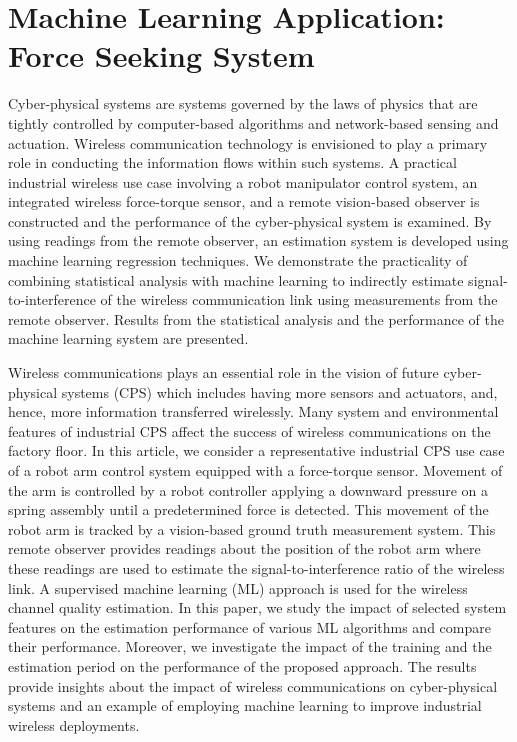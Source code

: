 
\chapter{Machine Learning Application: Force Seeking System}\label{chapter:ftml}

	
\chapterintro*


Cyber-physical systems are systems governed by the laws of physics that are tightly controlled by computer-based algorithms and network-based sensing and actuation.  Wireless communication technology is envisioned to play a primary role in conducting the information flows within such systems. A practical industrial wireless use case involving a robot manipulator control system, an integrated wireless force-torque sensor, and a remote vision-based observer is constructed and the performance of the cyber-physical system is examined. By using readings from the remote observer, an estimation system is developed using machine learning regression techniques.  We demonstrate the practicality of combining statistical analysis with machine learning to indirectly estimate signal-to-interference of the wireless communication link using measurements from the remote observer.  Results from the statistical analysis and the performance of the machine learning system are presented.

Wireless communications plays an essential role in the vision of future cyber-physical systems (CPS) which includes having more sensors and actuators, and, hence, more information transferred wirelessly. Many system and environmental features of industrial CPS affect the success of wireless communications on the factory floor. In this article, we consider a representative industrial CPS use case of a robot arm control system equipped with a force-torque sensor. Movement of the arm is controlled by a robot controller applying a downward pressure on a spring assembly until a predetermined force is detected. This movement of the robot arm is tracked by a vision-based ground truth measurement system. This remote observer provides readings about the position of the robot arm where these readings are used to estimate the signal-to-interference ratio of the wireless link. A supervised machine learning (ML) approach is used for the wireless channel quality estimation. In this paper, we study the impact of selected system features on the estimation performance of various ML algorithms and compare their performance. Moreover, we investigate the impact of the training and the estimation period on the performance of the proposed approach. The results provide insights about the impact of wireless communications on cyber-physical systems and an example of employing machine learning to improve industrial wireless deployments. 


